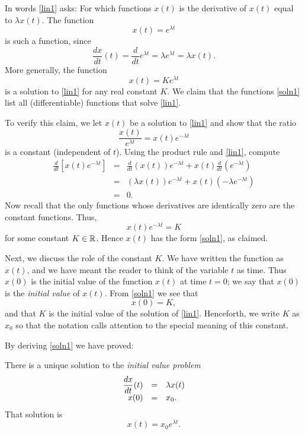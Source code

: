 \documentclass{ximera}
\begin{document}
In words \eqref{lin1} asks: For which functions $x(t)$ is the
derivative of $x(t)$ equal to $\lambda x(t)$.  The function
\[
x(t)=e^{\lambda t}
\]
is such a function, since
\[
\frac{dx}{dt}(t) = \frac{d}{dt}e^{\lambda t} =
\lambda e^{\lambda t} = \lambda x(t).
\]
More generally, the function
\begin{equation} \label{soln1}
x(t) = K e^{\lambda t}
\end{equation}
is a solution to \eqref{lin1} for any real constant $K$.  We claim
that the functions \eqref{soln1} list all (differentiable)
functions that solve \eqref{lin1}.

To verify this claim, we let $x(t)$ be a solution to \eqref{lin1}
and show that the ratio 
\[
\frac{x(t)}{e^{\lambda t}} = x(t)e^{-\lambda t}
\]
is a constant (independent of $t$).  Using the product rule 
 and \eqref{lin1}, compute
\begin{eqnarray*}
\frac{d}{dt}\left[x(t)e^{-\lambda t}\right] & = &
\frac{d}{dt}\left(x(t)\right) e^{-\lambda t} +
x(t)\frac{d}{dt}\left(e^{-\lambda t}\right) \\
& = &
(\lambda x(t)) e^{-\lambda t} + x(t)(-\lambda e^{-\lambda t}) \\
& = & 0.
\end{eqnarray*}
Now recall that the only functions whose derivatives are
identically zero are the constant functions.  Thus,
\[
x(t) e^{-\lambda t} = K
\]
for some constant $K\in\mbox{$\Bbb{R}$}$.  Hence $x(t)$ has the form
\eqref{soln1}, as claimed.

Next, we discuss the role of the constant $K$.  We have written
the function as $x(t)$, and we have meant the reader to think of
the variable $t$ as time.  Thus $x(0)$ is the initial value of
the function $x(t)$ at time $t=0$; we say that $x(0)$ is the
{\em initial value\/} of $x(t)$.
From \eqref{soln1} we see that
\[
x(0) = K,
\]
and that $K$ is the initial value of the solution of \eqref{lin1}.
Henceforth, we write $K$ as $x_0$ so that the notation calls
attention to the special meaning of this constant.

By deriving \eqref{soln1} we have proved:
\begin{theorem}  \label{T:singleeqn}
There is a unique solution to the {\em initial value problem\/}
\arraystart
\begin{equation} \label{ivp1}
\begin{array}{rcl}
\displaystyle \frac{dx}{dt}(t) & = & \lambda x(t) \\
x(0) & = & x_0.
\end{array}
\end{equation}
\arrayfinish
That solution is
\[
x(t) = x_0e^{\lambda t}.
\]
\end{theorem}
\end{document}
